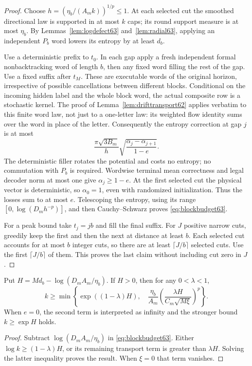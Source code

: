 \begin{proof}
Choose $h=(\eta_b/(A_m k))^{1/p}\le1$.
At each selected cut the smoothed directional law is supported in at
most $k$ caps; its round support measure is at most $\eta_b$.
By Lemmas~\ref{lem:logdefect63} and~\ref{lem:radial63}, applying an
independent $P_b$ word lowers its entropy by at least $d_b$.

Use a deterministic prefix to $t_0$. In each gap apply a fresh
independent formal nonbacktracking word of length $b$, then any fixed
word filling the rest of the gap. Use a fixed suffix after $t_M$.
These are executable words of the original horizon, irrespective of
possible cancellations between different blocks. Conditional on the
incoming hidden label and the whole block word, the actual composite
row is a stochastic kernel. The proof of
Lemma~\ref{lem:drifttransport62} applies verbatim to this finite word
law, not just to a one-letter law: its weighted flow identity sums over
the word in place of the letter. Consequently the entropy correction
at gap $j$ is at most
\[
 \frac{\pi\sqrt{3B_m}}h
       \sqrt{\frac{\alpha_j-\alpha_{j+1}}{1-e}}.
\]
The deterministic filler rotates the potential and costs no entropy;
no commutation with $P_b$ is required. Wordwise terminal mean
correctness and legal decoder norm at most one give
$\alpha_j\ge1-e$. At the first selected cut the physical vector is
deterministic, so $\alpha_0=1$, even with randomized initialization.
Thus the losses sum to at most $e$. Telescoping the entropy, using
its range $[0,\log(D_mh^{-p})]$, and then Cauchy--Schwarz proves
\eqref{eq:blockbudget63}.

For a peak bound take $t_j=jb$ and fill the final suffix. For $J$
positive narrow cuts, greedily keep the first and then the next at
distance at least $b$. Each selected cut accounts for at most $b$
integer cuts, so there are at least $\lceil J/b\rceil$ selected cuts.
Use the first $\lceil J/b\rceil$ of them. This proves the last claim
without including cut zero in $J$.
\end{proof}

\begin{corollary}\label{cor:inversion63}
Put $H=M d_b-\log(D_m A_m/\eta_b)$. If $H>0$, then for any
$0<\lambda<1$,
\begin{equation}\label{eq:inversion63}
 k\ge\min\left\{
 \exp((1-\lambda)H),\quad
 \frac{\eta_b}{A_m}
 \left(\frac{\lambda H}{C_m\sqrt{M\xi}}\right)^p
 \right\}.
\end{equation}
When $e=0$, the second term is interpreted as infinity and the stronger
bound $k\ge\exp H$ holds.
\end{corollary}
\begin{proof}
Subtract $\log(D_m A_m/\eta_b)$ in \eqref{eq:blockbudget63}.
Either $\log k\ge(1-\lambda)H$, or its remaining transport term
is greater than $\lambda H$. Solving the latter inequality proves
the result. When $\xi=0$ that term vanishes.
\end{proof}

